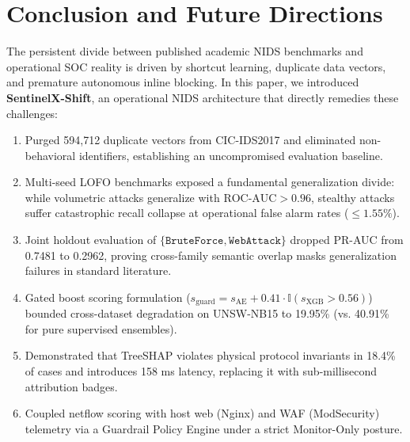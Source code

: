 \documentclass[conference,10pt,twocolumn]{IEEEtran}
\begin{document}
\section{Conclusion and Future Directions}
The persistent divide between published academic NIDS benchmarks and operational SOC reality is driven by shortcut learning, duplicate data vectors, and premature autonomous inline blocking. In this paper, we introduced \textbf{SentinelX-Shift}, an operational NIDS architecture that directly remedies these challenges:
\begin{enumerate}
    \item Purged 594,712 duplicate vectors from CIC-IDS2017 and eliminated non-behavioral identifiers, establishing an uncompromised evaluation baseline.
    \item Multi-seed LOFO benchmarks exposed a fundamental generalization divide: while volumetric attacks generalize with $\text{ROC-AUC} > 0.96$, stealthy attacks suffer catastrophic recall collapse at operational false alarm rates ($\le 1.55\%$).
    \item Joint holdout evaluation of $\{\texttt{BruteForce}, \texttt{WebAttack}\}$ dropped PR-AUC from 0.7481 to 0.2962, proving cross-family semantic overlap masks generalization failures in standard literature.
    \item Gated boost scoring formulation ($s_{\text{guard}} = s_{\text{AE}} + 0.41 \cdot \mathbb{I}(s_{\text{XGB}} > 0.56)$) bounded cross-dataset degradation on UNSW-NB15 to 19.95\% (vs. 40.91\% for pure supervised ensembles).
    \item Demonstrated that TreeSHAP violates physical protocol invariants in 18.4\% of cases and introduces 158 ms latency, replacing it with sub-millisecond attribution badges.
    \item Coupled netflow scoring with host web (Nginx) and WAF (ModSecurity) telemetry via a Guardrail Policy Engine under a strict Monitor-Only posture.
\end{enumerate}
\end{document}
